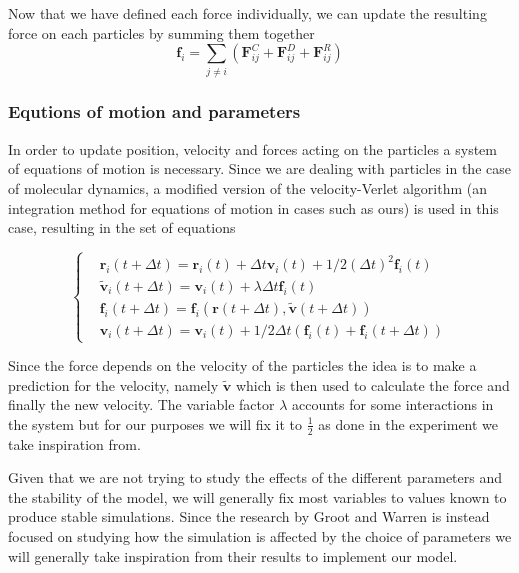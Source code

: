 \documentclass[]{usiinfbachelorproject}
\begin{document}
Now that we have defined each force individually, we can update the resulting force on each particles by summing them together 
\begin{equation}
  \label{eq:forces}
  \textbf{f}_i = \sum_{j \neq i} (\textbf{F}^C_{ij} + \textbf{F}^D_{ij} + \textbf{F}^R_{ij})
\end{equation}

\subsubsection{Equtions of motion and parameters}\label{sub:EqMotion}
In order to update position, velocity and forces acting on the particles a system of equations of motion is 
necessary. Since we are dealing with particles in the case of molecular dynamics, a modified version of the 
velocity-Verlet algorithm (an integration method for equations of motion in cases such as ours) is used in this case, 
resulting in the set of equations 

\begin{equation*}
    \left\{
        \begin{aligned}
          & \textbf{r}_i (t + \Delta t) = \textbf{r}_i (t) + \Delta t \textbf{v}_i (t) + 1/2(\Delta t)^2 \textbf{f}_i(t)\\
          & \tilde{\textbf{v}}_i (t + \Delta t) = \textbf{v}_i (t) + \lambda  \Delta t \textbf{f}_i(t)\\
          & \textbf{f}_i(t + \Delta t) = \textbf{f}_i(\textbf{r} (t + \Delta t), \tilde{\textbf{v}} (t + \Delta t))\\
          & \textbf{v}_i (t + \Delta t) = \textbf{v}_i (t) + 1/2 \Delta t (\textbf{f}_i(t) + \textbf{f}_i(t + \Delta t))
        \end{aligned}
      \right.
\end{equation*}
\vspace{2em}

Since the force depends on the velocity of the particles the idea is to make a prediction for the velocity, namely 
$\tilde{\textbf{v}}$ which is then used to calculate the force and finally the new velocity. The variable factor 
$\lambda$ accounts for some interactions in the system but for our purposes we will fix it to $\frac{1}{2}$ as 
done in the experiment we take inspiration from. 

Given that we are not trying to study the effects of the different parameters and the stability of the model, we 
will generally fix most variables to values known to produce stable simulations. Since the research by Groot and Warren is 
instead focused on studying how the simulation is affected by the choice of parameters we will generally take inspiration 
from their results to implement our model.
\end{document}
